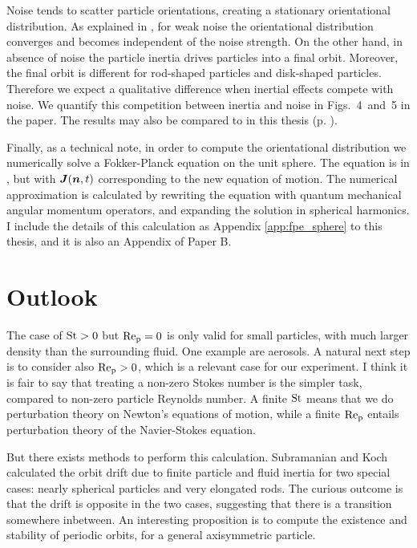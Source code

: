 \documentclass[thesis.tex]{subfiles}
\begin{document}
Noise tends to scatter particle orientations, creating a stationary orientational distribution. As explained in , for weak noise the orientational distribution converges and becomes independent of the noise strength. On the other hand, in absence of noise the particle inertia drives particles into a final orbit. Moreover, the final orbit is different for rod-shaped particles and disk-shaped particles. Therefore we expect a qualitative difference when inertial effects compete with noise. We quantify this competition between inertia and noise in Figs.~4~and~5 in the paper. The results may also be compared to  in this thesis (p. \pageref{fig:sintheta1}).

Finally, as a technical note, in order to compute the orientational distribution we numerically solve a Fokker-Planck equation on the unit sphere. The equation is  in , but with $\mbox{\boldmath$J$}(\mbox{\boldmath$n$}, t)$ corresponding to the new equation of motion. The numerical approximation is calculated by rewriting the equation with quantum mechanical angular momentum operators, and expanding the solution in spherical harmonics. I include the details of this calculation as Appendix \ref{app:fpe_sphere} to this thesis, and it is also an Appendix of Paper B.

\section{Outlook}

The case of $\mbox{St}>0$ but $\mbox{Re}_{\mathrm p}=0$ is only valid for small particles, with much larger density than the surrounding fluid. One example are aerosols. A natural next step is to consider also $\mbox{Re}_{\mathrm p} > 0$, which is a relevant case for our experiment. I think it is fair to say that treating a non-zero Stokes number is the simpler task, compared to non-zero particle Reynolds number. A finite $\mbox{St}$ means that we do perturbation theory on Newton's equations of motion, while a finite $\mbox{Re}_{\mathrm p}$ entails perturbation theory of the Navier-Stokes equation.

But there exists methods to perform this calculation. Subramanian and Koch \cite{subramanian2005,subramanian2006} calculated the orbit drift due to finite particle and fluid inertia for two special cases: nearly spherical particles and very elongated rods. The curious outcome is that the drift is opposite in the two cases, suggesting that there is a transition somewhere inbetween. An interesting proposition is to compute the existence and stability of periodic orbits, for a general axisymmetric particle. 
\end{document}
